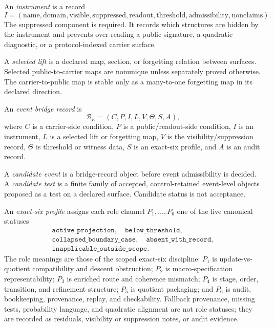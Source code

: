 \documentclass[11pt]{article}
\theoremstyle{definition}
\begin{document}
An \emph{instrument} is a record
\[
  I=(\mathrm{name},\mathrm{domain},\mathrm{visible},\mathrm{suppressed},
  \mathrm{readout},\mathrm{threshold},\mathrm{admissibility},\mathrm{nonclaims}).
\]
The suppressed component is required. It records which structures are hidden by the instrument and prevents over-reading a public signature, a quadratic diagnostic, or a protocol-indexed carrier surface.

A \emph{selected lift} is a declared map, section, or forgetting relation between surfaces. Selected public-to-carrier maps are nonunique unless separately proved otherwise. The carrier-to-public map is stable only as a many-to-one forgetting map in its declared direction.

An \emph{event bridge record} is
\[
  \mathcal B_E=(C,P,I,L,V,\Theta,S,A),
\]
where \(C\) is a carrier-side condition, \(P\) is a public/readout-side condition, \(I\) is an instrument, \(L\) is a selected lift or forgetting map, \(V\) is the visibility/suppression record, \(\Theta\) is threshold or witness data, \(S\) is an exact-six profile, and \(A\) is an audit record.

A \emph{candidate event} is a bridge-record object before event admissibility is decided. A \emph{candidate test} is a finite family of accepted, control-retained event-level objects proposed as a test on a declared surface. Candidate status is not acceptance.

An \emph{exact-six profile} assigns each role channel $P_1,\ldots,P_6$ one of the five canonical statuses
\[
\begin{gathered}
\texttt{active\_projection},\quad
\texttt{below\_threshold},\\
\texttt{collapsed\_boundary\_case},\quad
\texttt{absent\_with\_record},\\
\texttt{inapplicable\_outside\_scope}.
\end{gathered}
\]
The role meanings are those of the scoped exact-six discipline: $P_1$ is update-vs-quotient compatibility and descent obstruction; $P_2$ is macro-specification representability; $P_3$ is enriched route and coherence mismatch; $P_4$ is stage, order, transition, and refinement structure; $P_5$ is quotient packaging; and $P_6$ is audit, bookkeeping, provenance, replay, and checkability. Fallback provenance, missing tests, probability language, and quadratic alignment are not role statuses; they are recorded as residuals, visibility or suppression notes, or audit evidence.
\end{document}
